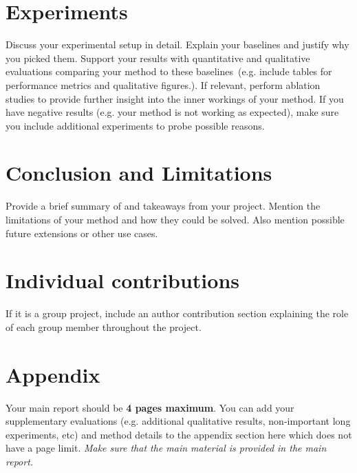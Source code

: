 \documentclass[10pt,conference,compsocconf]{IEEEtran}
\begin{document}
\section{Experiments}

Discuss your experimental setup in detail. Explain your baselines and justify why you picked them. Support your results with quantitative and qualitative evaluations comparing your method to these baselines~(e.g. include tables for performance metrics and qualitative figures.). If relevant, perform ablation studies to provide further insight into the inner workings of your method. If you have negative results (e.g. your method is not working as expected), make sure you include additional experiments to probe possible reasons.


\section{Conclusion and Limitations}

Provide a brief summary of and takeaways from your project. Mention the limitations of your method and how they could be solved. Also mention possible future extensions or other use cases.

\section{Individual contributions}

If it is a group project, include an author contribution section explaining the role of each group member throughout the project. 





\clearpage
\section{Appendix}

Your main report should be \textbf{4 pages maximum}. You can add your supplementary evaluations (e.g. additional qualitative results, non-important long experiments, etc) and method details to the appendix section here which does not have a page limit. \textit{Make sure that the main material is provided in the main report.} 
\end{document}
